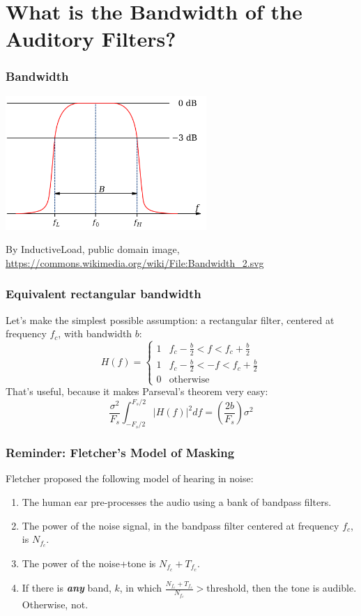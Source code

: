 \section[Bandwidth]{What is the Bandwidth of the Auditory Filters?}
\setcounter{subsection}{1}

\begin{frame}
  \frametitle{Bandwidth}

  \centerline{\includegraphics[height=2in]{Bandwidth_2.png}}
  \begin{tiny}
    By InductiveLoad, public domain image,
    \url{https://commons.wikimedia.org/wiki/File:Bandwidth_2.svg}
  \end{tiny}
\end{frame}

\begin{frame}
  \frametitle{Equivalent rectangular bandwidth}

  Let's make the simplest possible assumption: a rectangular filter,
  centered at frequency $f_c$, with bandwidth $b$:
  \[
  H(f) = \begin{cases}
    1 & f_c-\frac{b}{2} < f <f_c+\frac{b}{2}\\
    1 & f_c-\frac{b}{2} < -f < f_c+\frac{b}{2}\\
    0 & \mbox{otherwise}
  \end{cases}
  \]
  That's useful, because it makes Parseval's theorem very easy:
  \[
  \frac{\sigma^2}{F_s}\int_{-F_s/2}^{F_s/2} |H(f)|^2 df = \left(\frac{2b}{F_s}\right)\sigma^2
  \]
\end{frame}
  
\begin{frame}
  \frametitle{Reminder: Fletcher's Model of Masking}

  Fletcher proposed the following model of hearing in noise:
  \begin{enumerate}
  \item The human ear pre-processes  the audio using a bank of bandpass filters.
  \item The power of the noise signal, in the 
    bandpass filter centered at frequency $f_c$, is $N_{f_c}$.
  \item The power of the noise+tone is $N_{f_c}+T_{f_c}$.
  \item If there is {\bf\em any} band, $k$, in which
    $\frac{N_{f_c}+T_{f_c}}{N_{f_c}}>\mbox{threshold}$, then the tone is audible.
    Otherwise, not.
  \end{enumerate}
\end{frame}

